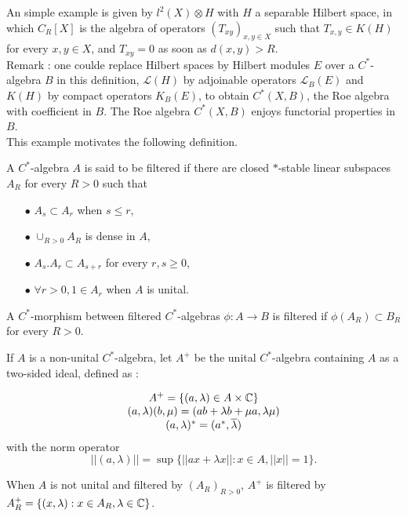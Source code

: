 An simple example is given by $l^2(X)\otimes H$ with $H$ a separable Hilbert space, in which $C_R[X]$ is the algebra of operators $(T_{xy})_{x,y\in X}$ such that $T_{x,y}\in K(H)$ for every $x,y\in X$, and $T_{xy}=0$ as soon as $d(x,y)>R$.\\
Remark : one coulde replace Hilbert spaces by Hilbert modules $E$ over a $C^*$-algebra $B$ in this definition, $\mathcal L(H)$ by adjoinable operators $\mathcal L_B(E)$ and $K(H)$ by compact operators $K_B(E)$, to obtain $C^*(X,B)$, the Roe algebra with coefficient in $B$. The Roe algebra $C^*(X,B)$ enjoys functorial properties in $B$.\\

This example motivates the following definition.\\

\begin{definition}
A $C^*$-algebra $A$ is said to be filtered if there are closed $*$-stable linear subspaces $A_R$ for every $R>0$ such that
\begin{itemize}
\item[$\bullet$] $A_s \subset A_r$ when $s\leq r$,
\item[$\bullet$] $\cup_{R>0} A_R$ is dense in $A$,
\item[$\bullet$] $A_s . A_r \subset A_{s+r}$ for every $r,s \geq 0$,
\item[$\bullet$] $\forall r>0, 1\in A_r$ when $A$ is unital.\\
\end{itemize}

A $C^*$-morphism between filtered $C^*$-algebras $\phi : A \rightarrow B$ is filtered if $\phi(A_R)\subset B_R$ for every $R>0$.
\end{definition}

If $A$ is a non-unital $C^*$-algebra, let $A^+$ be the unital $C^*$-algebra containing $A$ as a two-sided ideal, defined as :

\[\begin{array}{c}A^+=\{(a,\lambda)\in A\times \mathbb C \} \\ (a,\lambda)(b,\mu)=(ab+\lambda b +\mu a,\lambda\mu) \\ (a,\lambda)^*=(a^*,\overline\lambda)\end{array}\]
with the norm operator
\[||(a,\lambda)||=\sup \{||ax+\lambda x|| : x\in A , ||x||=1\}.\]

When $A$ is not unital and filtered by $(A_R)_{R>0}$, $A^+$ is filtered by $A_R^+= \{(x,\lambda) : x\in A_R,\lambda\in \mathbb C\}$.

